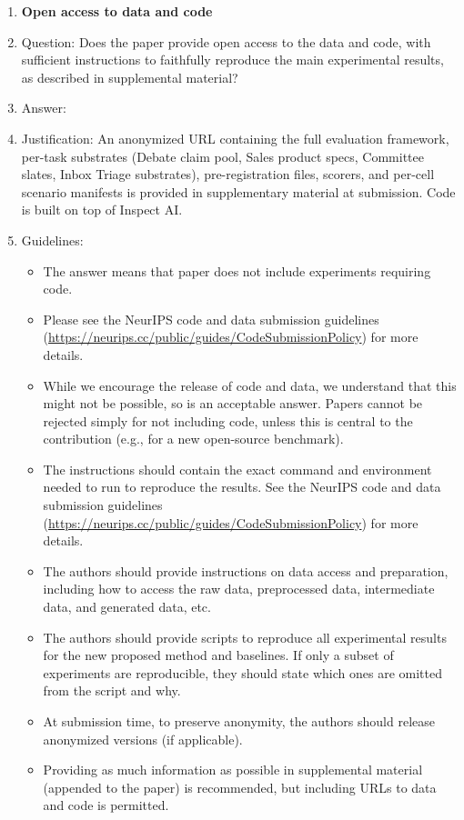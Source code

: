 \documentclass{article}
\begin{document}
\begin{enumerate}
\item {\bf Open access to data and code}
    \item[] Question: Does the paper provide open access to the data and code, with sufficient instructions to faithfully reproduce the main experimental results, as described in supplemental material?
    \item[] Answer: \answerYes{} %
    \item[] Justification: An anonymized URL containing the full evaluation framework, per-task substrates (Debate claim pool, Sales product specs, Committee slates, Inbox Triage substrates), pre-registration files, scorers, and per-cell scenario manifests is provided in supplementary material at submission. Code is built on top of Inspect AI.
    \item[] Guidelines:
    \begin{itemize}
        \item The answer \answerNA{} means that paper does not include experiments requiring code.
        \item Please see the NeurIPS code and data submission guidelines (\url{https://neurips.cc/public/guides/CodeSubmissionPolicy}) for more details.
        \item While we encourage the release of code and data, we understand that this might not be possible, so \answerNo{} is an acceptable answer. Papers cannot be rejected simply for not including code, unless this is central to the contribution (e.g., for a new open-source benchmark).
        \item The instructions should contain the exact command and environment needed to run to reproduce the results. See the NeurIPS code and data submission guidelines (\url{https://neurips.cc/public/guides/CodeSubmissionPolicy}) for more details.
        \item The authors should provide instructions on data access and preparation, including how to access the raw data, preprocessed data, intermediate data, and generated data, etc.
        \item The authors should provide scripts to reproduce all experimental results for the new proposed method and baselines. If only a subset of experiments are reproducible, they should state which ones are omitted from the script and why.
        \item At submission time, to preserve anonymity, the authors should release anonymized versions (if applicable).
        \item Providing as much information as possible in supplemental material (appended to the paper) is recommended, but including URLs to data and code is permitted.
    \end{itemize}



\end{enumerate}
\end{document}
